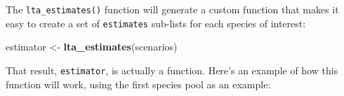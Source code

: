 \documentclass[
]{book}
\newenvironment{Shaded}{\begin{snugshade}}{\end{snugshade}}
\newcommand{\DataTypeTok}[1]{\textcolor[rgb]{0.13,0.29,0.53}{#1}}
\newcommand{\DecValTok}[1]{\textcolor[rgb]{0.00,0.00,0.81}{#1}}
\newcommand{\KeywordTok}[1]{\textcolor[rgb]{0.13,0.29,0.53}{\textbf{#1}}}
\newcommand{\NormalTok}[1]{#1}
\newcommand{\OperatorTok}[1]{\textcolor[rgb]{0.81,0.36,0.00}{\textbf{#1}}}
\newcommand{\StringTok}[1]{\textcolor[rgb]{0.31,0.60,0.02}{#1}}
\begin{document}
The \texttt{lta\_estimates()} function will generate a custom function that makes it easy to create a set of \texttt{estimates} sub-lists for each species of interest:

\begin{Shaded}
\begin{Highlighting}[]
\NormalTok{estimator <-}\StringTok{ }\KeywordTok{lta_estimates}\NormalTok{(scenarios)}
\end{Highlighting}
\end{Shaded}

That result, \texttt{estimator}, is actually a function. Here's an example of how this function will work, using the first species pool as an example:

\begin{Shaded}
\end{Shaded}
\end{document}
